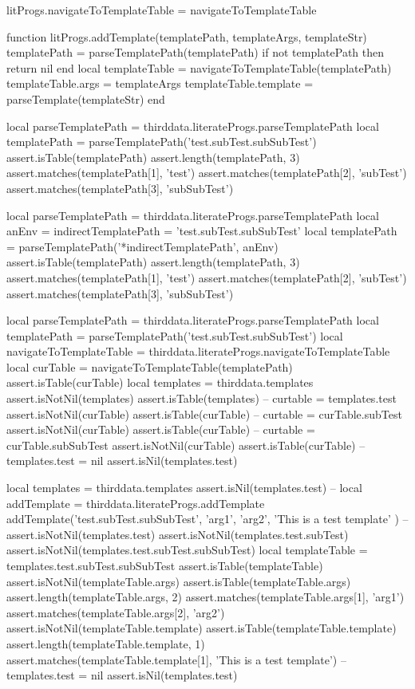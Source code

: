 {{litProgs.navigateToTemplateTable = navigateToTemplateTable

function litProgs.addTemplate(templatePath, templateArgs, templateStr)
  templatePath = parseTemplatePath(templatePath)
  if not templatePath then return nil end
  local templateTable    = navigateToTemplateTable(templatePath)
  templateTable.args     = templateArgs
  templateTable.template = parseTemplate(templateStr)
end
\stopLuaCode

\startLuaTest
local parseTemplatePath = thirddata.literateProgs.parseTemplatePath
local templatePath = parseTemplatePath('test.subTest.subSubTest')
assert.isTable(templatePath)
assert.length(templatePath, 3)
assert.matches(templatePath[1], 'test')
assert.matches(templatePath[2], 'subTest')
assert.matches(templatePath[3], 'subSubTest')
\stopLuaTest
\stopTestCase


\startLuaTest
local parseTemplatePath = thirddata.literateProgs.parseTemplatePath
local anEnv = {
  indirectTemplatePath = 'test.subTest.subSubTest'
}
local templatePath = parseTemplatePath('*indirectTemplatePath', anEnv)
assert.isTable(templatePath)
assert.length(templatePath, 3)
assert.matches(templatePath[1], 'test')
assert.matches(templatePath[2], 'subTest')
assert.matches(templatePath[3], 'subSubTest')
\stopLuaTest
\stopTestCase

\startLuaTest
local parseTemplatePath = thirddata.literateProgs.parseTemplatePath
local templatePath = parseTemplatePath('test.subTest.subSubTest')
local navigateToTemplateTable = thirddata.literateProgs.navigateToTemplateTable
local curTable = navigateToTemplateTable(templatePath)
assert.isTable(curTable)
local templates = thirddata.templates
assert.isNotNil(templates)
assert.isTable(templates)
--
curtable = templates.test
assert.isNotNil(curTable)
assert.isTable(curTable)
--
curtable = curTable.subTest
assert.isNotNil(curTable)
assert.isTable(curTable)
--
curtable = curTable.subSubTest
assert.isNotNil(curTable)
assert.isTable(curTable)
--
templates.test = nil
assert.isNil(templates.test)
\stopLuaTest
\stopTestCase

\startLuaTest
local templates = thirddata.templates
assert.isNil(templates.test)
--
local addTemplate = thirddata.literateProgs.addTemplate
addTemplate('test.subTest.subSubTest',
  { 'arg1', 'arg2'},
  'This is a test template'
)
--
assert.isNotNil(templates.test)
assert.isNotNil(templates.test.subTest)
assert.isNotNil(templates.test.subTest.subSubTest)
local templateTable = templates.test.subTest.subSubTest
assert.isTable(templateTable)
assert.isNotNil(templateTable.args)
assert.isTable(templateTable.args)
assert.length(templateTable.args, 2)
assert.matches(templateTable.args[1], 'arg1')
assert.matches(templateTable.args[2], 'arg2')
assert.isNotNil(templateTable.template)
assert.isTable(templateTable.template)
assert.length(templateTable.template, 1)
assert.matches(templateTable.template[1], 'This is a test template')
--
templates.test = nil
assert.isNil(templates.test)
\stopLuaTest
\stopTestCase

}}
